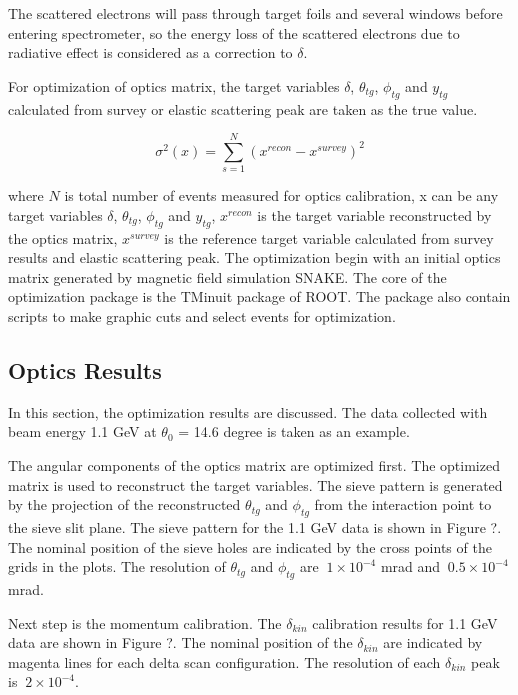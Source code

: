 The scattered electrons will pass through target foils and several windows before entering spectrometer,
so the energy loss of the scattered electrons due to radiative effect is considered as a correction to
$\delta$.

For optimization of optics matrix, the target variables  $\delta$, $\theta_{tg}$, $\phi_{tg}$ and $y_{tg}$
calculated from survey or elastic scattering peak are taken as the true value.

\begin{equation}
\sigma^2(x) = \sum\limits_{s=1}^{N}  (x^{recon} - x^{survey})^2 
\end{equation}

where $N$ is total number of events measured for optics calibration, x can be any target variables
$\delta$, $\theta_{tg}$, $\phi_{tg}$ and $y_{tg}$, $x^{recon}$ is the target variable 
reconstructed by the optics matrix, $x^{survey}$ is the reference target variable calculated from
survey results and elastic scattering peak. 
The optimization begin with an initial optics matrix generated by magnetic field simulation SNAKE.
The core of the optimization package is the TMinuit package of ROOT.
The package also contain scripts to make graphic cuts and select events for optimization.

\subsection[Optics Results]{Optics Results}
In this section, the optimization results are discussed. The data collected with beam energy 1.1 GeV
at $\theta_0$ = 14.6 degree is taken as an example.

The angular components of the optics matrix are optimized first.
The optimized matrix is used to reconstruct the target variables. The sieve pattern is generated by
the projection of the reconstructed $\theta_{tg}$ and $\phi_{tg}$ from the interaction point to the sieve
slit plane. The sieve pattern for the 1.1 GeV data is shown in Figure ?.
The nominal position of the sieve holes are indicated by the cross points of the grids in the plots.
The resolution of $\theta_{tg}$ and $\phi_{tg}$ are $~1\times 10^{-4}$ mrad and $~ 0.5 \times 10^{-4}$ mrad.

Next step is the momentum calibration. The $\delta_{kin}$ calibration results for 1.1 GeV data are
shown in Figure ?. The nominal position of the $\delta_{kin}$ are indicated by magenta lines for each
delta scan configuration. The resolution of each $\delta_{kin}$ peak is $~ 2 \times 10^{-4}$. 

